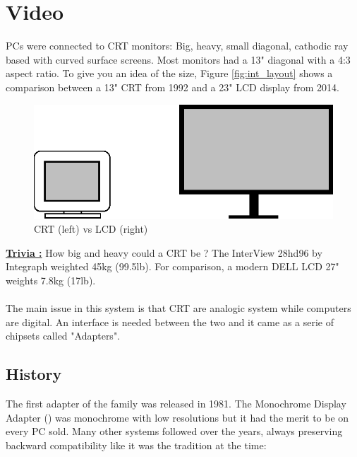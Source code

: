 \documentclass[book.tex]{subfiles}
\begin{document}
\section{Video}

PCs were connected to CRT monitors: Big, heavy, small diagonal, cathodic ray based with curved surface screens. Most monitors had a 13" diagonal with a 4:3 aspect ratio. To give you an idea of the size, Figure \ref{fig:int_layout} shows a comparison between a 13" CRT from 1992 and a 23" LCD display from 2014.\\

\begin{figure}[H]
\centering
\includegraphics[width=\textwidth]{imgs/crt_lcd.eps}
\caption{CRT (left) vs LCD (right)}
\label{fig:lcd_vs_crt}
\end{figure}

\textbf{\underline{Trivia :}} How big and heavy could a CRT be ? The InterView 28hd96 by Integraph weighted 45kg (99.5lb). For comparison, a modern DELL LCD 27" weights 7.8kg (17lb).\\
\\
The main issue in this system is that CRT are analogic system while computers are digital. An interface is needed between the two and it came as a serie of chipsets called "Adapters". 

  \subsection{History}

The first adapter of the family was released in 1981. The Monochrome Display
   Adapter () was monochrome with low resolutions but it had the merit to be on every PC sold. Many other systems followed over the years, always preserving backward compatibility like it was the tradition at the time:
\bigskip
  
\end{document}
